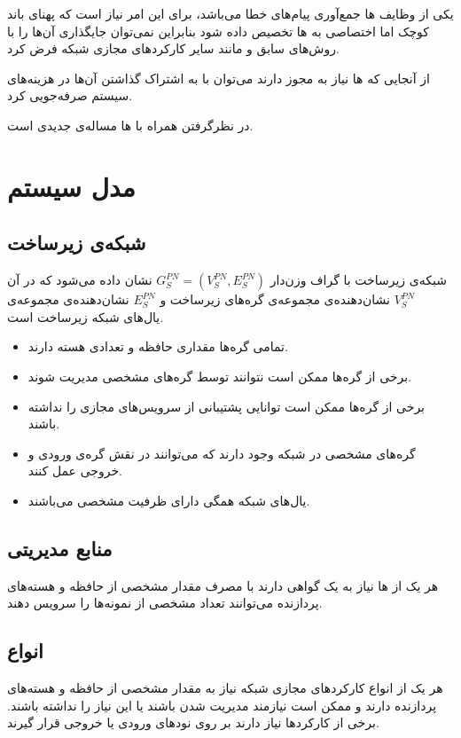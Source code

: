 یکی از وظایف ها جمع‌آوری پیام‌های خطا می‌باشد،
برای این امر نیاز است که پهنای باند کوچک اما اختصاصی به ها
تخصیص داده شود بنابراین نمی‌توان جایگذاری آن‌ها را با روش‌های سابق و مانند سایر
کارکردهای مجازی شبکه فرض کرد.

از آنجایی که ها نیاز به مجوز دارند می‌توان با به اشتراک گذاشتن آن‌ها در هزینه‌های سیستم صرفه‌جویی کرد.

در نظرگرفتن  همراه با ها مساله‌ی جدیدی است.

\section{مدل سیستم}
\subsection{شبکه‌ی زیرساخت}
شبکه‌ی زیرساخت با گراف وزن‌دار
\(G_S^{PN} = (V_S^{PN}, E_S^{PN})\)
نشان داده می‌شود
که در آن
\(V_S^{PN}\)
نشان‌دهنده‌ی مجموعه‌ی گره‌های زیرساخت
و
\(E_S^{PN}\)
نشان‌دهنده‌ی مجموعه‌ی یال‌های شبکه زیرساخت
است.

\begin{itemize}
    \item تمامی گره‌ها مقداری حافظه و تعدادی هسته دارند.
    \item برخی از گره‌ها ممکن است نتوانند توسط گره‌های مشخصی مدیریت شوند.
    \item برخی از گره‌ها ممکن است توانایی پشتیبانی از سرویس‌های مجازی را نداشته باشند.
    \item گره‌های مشخصی در شبکه وجود دارند که می‌توانند در نقش گره‌ی ورودی و خروجی عمل کنند.
    \item یال‌های شبکه همگی دارای ظرفیت مشخصی می‌باشند.
\end{itemize}

\subsection{منابع مدیریتی}
هر یک از
‌ها
نیاز به یک گواهی دارند با مصرف مقدار مشخصی از حافظه و هسته‌های پردازنده
می‌توانند تعداد مشخصی از نمونه‌ها را سرویس دهند.

\subsection{انواع}
هر یک از انواع کارکردهای مجازی شبکه
نیاز به مقدار مشخصی از حافظه و هسته‌های پردازنده دارند
و ممکن است نیازمند مدیریت شدن باشند یا این نیاز را نداشته باشند.
برخی از کارکردها نیاز دارند بر روی نودهای ورودی یا خروجی قرار گیرند.

